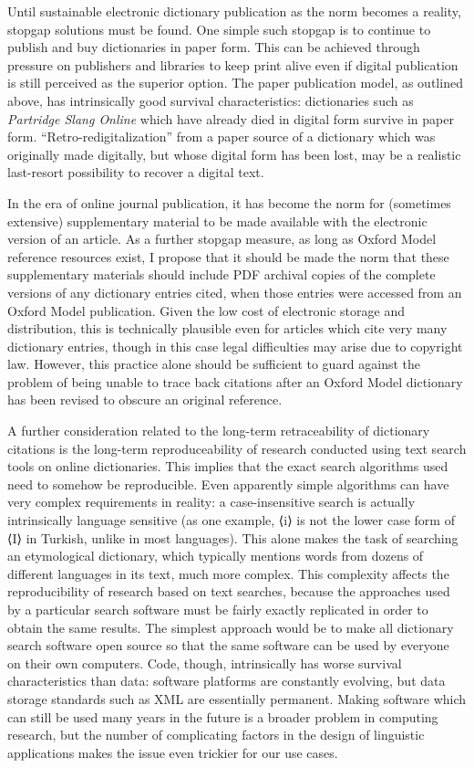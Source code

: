 \documentclass[output=paper]{langscibook}
\begin{document}
Until sustainable electronic dictionary publication as the norm becomes
a reality, stopgap solutions must be found. One simple such stopgap is
to continue to publish and buy dictionaries in paper form. This can be
achieved through pressure on publishers and libraries to keep print
alive even if digital publication is still perceived as the superior
option. The paper publication model, as outlined above, has
intrinsically good survival characteristics: dictionaries such as
\emph{Partridge Slang Online} which have already died in digital form
survive in paper form. “Retro\hyp redigitalization” from a paper source of a
dictionary which was originally made digitally, but whose digital form
has been lost, may be a realistic last-resort possibility to recover a
digital text.

In the era of online journal publication, it has become the norm for
(sometimes extensive) supplementary material to be made available with
the electronic version of an article. As a further stopgap measure, as
long as Oxford Model reference resources exist, I propose that it should
be made the norm that these supplementary materials should include PDF
archival copies of the complete versions of any dictionary entries
cited, when those entries were accessed from an Oxford Model
publication. Given the low cost of electronic storage and distribution,
this is technically plausible even for articles which cite very many
dictionary entries, though in this case legal difficulties may arise due
to copyright law. However, this practice alone should be sufficient to
guard against the problem of being unable to trace back citations after
an Oxford Model dictionary has been revised to obscure an original
reference.

A further consideration related to the long-term retraceability of
dictionary citations is the long-term reproduceability of research
conducted using text search tools on online dictionaries. This implies that the exact search algorithms used need to somehow be reproducible. Even apparently simple algorithms
can have very complex requirements in reality: a case-insensitive search
is actually intrinsically language sensitive (as one example, ⟨i⟩ is not
the lower case form of ⟨I⟩ in Turkish, unlike in most languages). This
alone makes the task of searching an etymological dictionary, which
typically mentions words from dozens of different languages in its text,
much more complex. This complexity affects the reproducibility of
research based on text searches, because the approaches used by a
particular search software must be fairly exactly replicated in order to
obtain the same results. The simplest approach would be to make all
dictionary search software open source so that the same software can be
used by everyone on their own computers. Code, though, intrinsically has
worse survival characteristics than data: software platforms are
constantly evolving, but data storage standards such as XML are
essentially permanent. Making software which can still be used many
years in the future is a broader problem in computing research, but the
number of complicating factors in the design of linguistic applications
makes the issue even trickier for our use cases.
\end{document}
